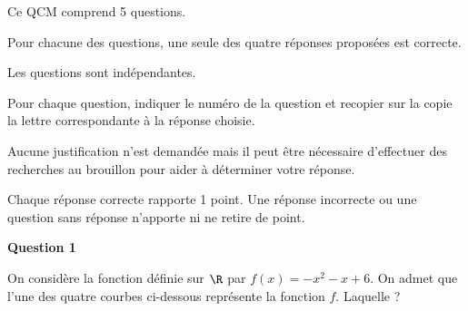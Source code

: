 \medskip

Ce QCM comprend 5 questions.

Pour chacune des questions, une seule des quatre réponses proposées est correcte.

Les questions sont indépendantes.

Pour chaque question, indiquer le numéro de la question et recopier sur la copie la lettre
correspondante à la réponse choisie.

Aucune justification n'est demandée mais il peut être nécessaire d'effectuer des recherches au
brouillon pour aider à déterminer votre réponse.

Chaque réponse correcte rapporte 1 point. Une réponse incorrecte ou une question sans réponse
n'apporte ni ne retire de point.

\medskip

\textbf{Question 1}

\medskip 

On considère la fonction définie sur $\R$ par $f(x) = -x^2 - x + 6$. On admet que l'une
des quatre courbes ci-dessous représente la fonction $f$. Laquelle ?

